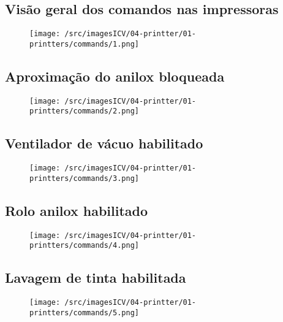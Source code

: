 \usepackage{graphicx}
\newpage
\thispagestyle{fancy}
\vspace{\fill}

\subsection{Visão geral dos comandos nas impressoras}
\begin{figure}
    \centering
    \texttt{[image: /src/imagesICV/04-printter/01-printters/commands/1.png]}
\end{figure}
\newpage
\thispagestyle{fancy}
\vspace{\fill}

\subsection{Aproximação do anilox bloqueada}
\begin{figure}
    \centering
    \texttt{[image: /src/imagesICV/04-printter/01-printters/commands/2.png]}
\end{figure}
\newpage
\thispagestyle{fancy}
\vspace{\fill}

\subsection{Ventilador de vácuo habilitado}
\begin{figure}
    \centering
    \texttt{[image: /src/imagesICV/04-printter/01-printters/commands/3.png]}
\end{figure}
\newpage
\thispagestyle{fancy}
\vspace{\fill}

\subsection{Rolo anilox habilitado}
\begin{figure}
    \centering
    \texttt{[image: /src/imagesICV/04-printter/01-printters/commands/4.png]}
\end{figure}
\newpage
\thispagestyle{fancy}
\vspace{\fill}

\subsection{Lavagem de tinta habilitada}
\begin{figure}
    \centering
    \texttt{[image: /src/imagesICV/04-printter/01-printters/commands/5.png]}
\end{figure}
\newpage
\thispagestyle{fancy}
\vspace{\fill}

